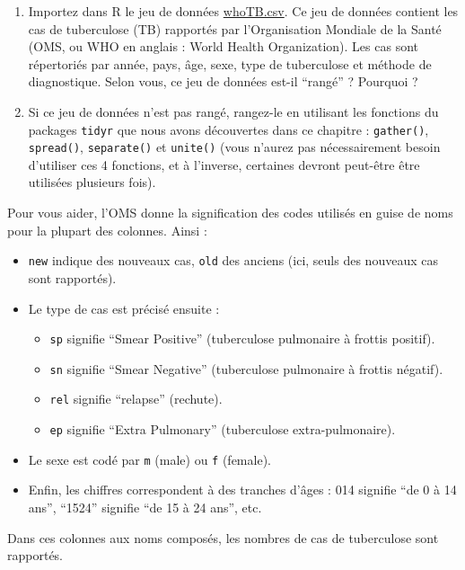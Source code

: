 \documentclass[a4paperpaper,]{article}
\providecommand{\tightlist}{%
  \setlength{\itemsep}{0pt}\setlength{\parskip}{0pt}}
\begin{document}
\begin{enumerate}
\def\labelenumi{\arabic{enumi}.}
\setcounter{enumi}{2}
\tightlist
\item
  Importez dans R le jeu de données \href{data/whoTB.csv}{whoTB.csv}. Ce jeu de données contient les cas de tuberculose (TB) rapportés par l'Organisation Mondiale de la Santé (OMS, ou WHO en anglais : World Health Organization). Les cas sont répertoriés par année, pays, âge, sexe, type de tuberculose et méthode de diagnostique. Selon vous, ce jeu de données est-il ``rangé'' ? Pourquoi ?
\item
  Si ce jeu de données n'est pas rangé, rangez-le en utilisant les fonctions du packages \texttt{tidyr} que nous avons découvertes dans ce chapitre : \texttt{gather()}, \texttt{spread()}, \texttt{separate()} et \texttt{unite()} (vous n'aurez pas nécessairement besoin d'utiliser ces 4 fonctions, et à l'inverse, certaines devront peut-être être utilisées plusieurs fois).
\end{enumerate}

Pour vous aider, l'OMS donne la signification des codes utilisés en guise de noms pour la plupart des colonnes. Ainsi :

\begin{itemize}
\tightlist
\item
  \texttt{new} indique des nouveaux cas, \texttt{old} des anciens (ici, seuls des nouveaux cas sont rapportés).
\item
  Le type de cas est précisé ensuite :

  \begin{itemize}
  \tightlist
  \item
    \texttt{sp} signifie ``Smear Positive'' (tuberculose pulmonaire à frottis positif).
  \item
    \texttt{sn} signifie ``Smear Negative'' (tuberculose pulmonaire à frottis négatif).
  \item
    \texttt{rel} signifie ``relapse'' (rechute).
  \item
    \texttt{ep} signifie ``Extra Pulmonary'' (tuberculose extra-pulmonaire).
  \end{itemize}
\item
  Le sexe est codé par \texttt{m} (male) ou \texttt{f} (female).
\item
  Enfin, les chiffres correspondent à des tranches d'âges : 014 signifie ``de 0 à 14 ans'', ``1524'' signifie ``de 15 à 24 ans'', etc.
\end{itemize}

Dans ces colonnes aux noms composés, les nombres de cas de tuberculose sont rapportés.
\end{document}
